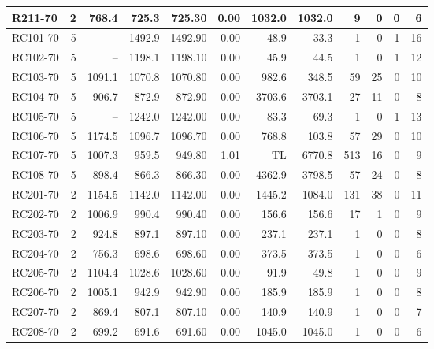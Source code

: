 \documentclass[10pt]{article}
\begin{document}
\begin{table}[p]
\begin{tabular}{lrrrrrrrrrrr}
R211-70 & 2 & 768.4 & 725.3 & 725.30 & 0.00 & 1032.0 & 1032.0 & 9 & 0 & 0 & 6 \\
\midrule
RC101-70 & 5 & -- & 1492.9 & 1492.90 & 0.00 & 48.9 & 33.3 & 1 & 0 & 1 & 16 \\
RC102-70 & 5 & -- & 1198.1 & 1198.10 & 0.00 & 45.9 & 44.5 & 1 & 0 & 1 & 12 \\
RC103-70 & 5 & 1091.1 & 1070.8 & 1070.80 & 0.00 & 982.6 & 348.5 & 59 & 25 & 0 & 10 \\
RC104-70 & 5 & 906.7 & 872.9 & 872.90 & 0.00 & 3703.6 & 3703.1 & 27 & 11 & 0 & 8 \\
RC105-70 & 5 & -- & 1242.0 & 1242.00 & 0.00 & 83.3 & 69.3 & 1 & 0 & 1 & 13 \\
RC106-70 & 5 & 1174.5 & 1096.7 & 1096.70 & 0.00 & 768.8 & 103.8 & 57 & 29 & 0 & 10 \\
RC107-70 & 5 & 1007.3 & 959.5 & 949.80 & 1.01 & TL & 6770.8 & 513 & 16 & 0 & 9 \\
RC108-70 & 5 & 898.4 & 866.3 & 866.30 & 0.00 & 4362.9 & 3798.5 & 57 & 24 & 0 & 8 \\
\midrule
RC201-70 & 2 & 1154.5 & 1142.0 & 1142.00 & 0.00 & 1445.2 & 1084.0 & 131 & 38 & 0 & 11 \\
RC202-70 & 2 & 1006.9 & 990.4 & 990.40 & 0.00 & 156.6 & 156.6 & 17 & 1 & 0 & 9 \\
RC203-70 & 2 & 924.8 & 897.1 & 897.10 & 0.00 & 237.1 & 237.1 & 1 & 0 & 0 & 8 \\
RC204-70 & 2 & 756.3 & 698.6 & 698.60 & 0.00 & 373.5 & 373.5 & 1 & 0 & 0 & 6 \\
RC205-70 & 2 & 1104.4 & 1028.6 & 1028.60 & 0.00 & 91.9 & 49.8 & 1 & 0 & 0 & 9 \\
RC206-70 & 2 & 1005.1 & 942.9 & 942.90 & 0.00 & 185.9 & 185.9 & 1 & 0 & 0 & 8 \\
RC207-70 & 2 & 869.4 & 807.1 & 807.10 & 0.00 & 140.9 & 140.9 & 1 & 0 & 0 & 7 \\
RC208-70 & 2 & 699.2 & 691.6 & 691.60 & 0.00 & 1045.0 & 1045.0 & 1 & 0 & 0 & 6 \\
\bottomrule
\end{tabular}
\end{table}
\clearpage
\end{document}
